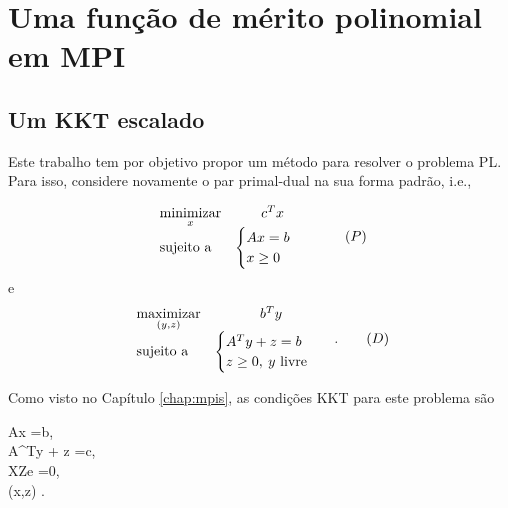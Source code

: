 





	\chapter{Uma função de mérito polinomial em \ac{MPI}}
\label{chap:merit-function}
\section{Um KKT escalado}



Este  trabalho tem por objetivo propor um método para resolver o problema
\ac{PL}. Para isso, considere novamente o par primal-dual na sua forma padrão,
i.e., 

 \begin{equation*}
	\begin{array}{lc}
\displaystyle \operatorname*{minimizar}_{x} & c^Tx \\
\text{sujeito a} &\begin{cases} Ax = b \\
				 x \geq 0	
				 \end{cases}\
\end{array}\tag{$P$}
\end{equation*}
e 
 \begin{equation}
	\begin{array}{lc}
\displaystyle \operatorname*{maximizar}_{(y,z)} & b^Ty \\
\text{sujeito a} &\begin{cases} A^Ty + z = b \\
				 z \geq 0, \:y \text{ livre}	
				 \end{cases}\
\end{array}.
\tag{$D$}
\end{equation}

Como visto no Capítulo \ref{chap:mpis}, as condições \ac{KKT}  para este
problema são

\begin{subnumcases}{\label{eq:KKT-choice}}
Ax =b,\label{eq:KKT-fac-primal-choice}\\
A^Ty + z =c, \label{eq:KKT-fac-dual-choice}\\
XZe =0,  \label{eq:KKT-complementar-choice}\\
(x,z) \geq 0. \label{eq:KKT-nao-negativ-choice}
\end{subnumcases}



